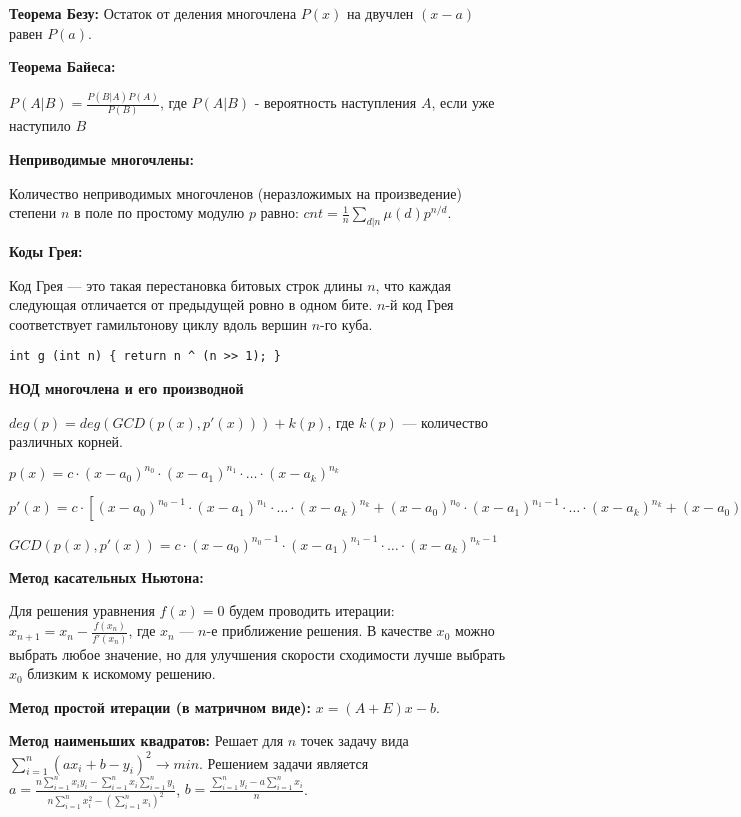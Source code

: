 \textbf{Теорема Безу:}
Остаток от деления многочлена $P(x)$ на двучлен $(x - a)$ равен $P(a)$.

\textbf{Теорема Байеса:}

$\displaystyle P(A|B)=\frac{P(B|A)P(A)}{P(B)}$, где $P(A|B)$ - вероятность наступления $A$, если уже наступило $B$

\textbf{Неприводимые многочлены:}

Количество неприводимых многочленов (неразложимых на произведение) степени $n$ в поле по простому модулю $p$ равно:
$cnt = \frac1n \sum\limits_{d|n}\mu(d)p^{n / d}$.

\textbf{Коды Грея:}

Код Грея --- это такая перестановка битовых строк длины $n$, что каждая следующая отличается от предыдущей ровно в одном бите.
$n$-й код Грея соответствует гамильтонову циклу вдоль вершин $n$-го куба.

\begin{verbatim}
int g (int n) { return n ^ (n >> 1); }
\end{verbatim}

\textbf{НОД многочлена и его производной}

$deg(p) = deg( GCD(p(x), p'(x)) ) + k(p)$, где $k(p)$ --- количество различных корней.

$p(x) = c \cdot (x - a_0)^{n_0} \cdot (x - a_1)^{n_1} \cdot \ldots \cdot (x - a_k)^{n_k}$

$p'(x) = c \cdot [ (x - a_0)^{n_0-1} \cdot (x - a_1)^{n_1} \cdot \ldots \cdot (x - a_k)^{n_k} + (x - a_0)^{n_0} \cdot (x - a_1)^{n_1-1} \cdot \ldots \cdot (x - a_k)^{n_k} + (x - a_0)^{n_0} \cdot (x - a_1)^{n_1} \cdot \ldots \cdot (x - a_k)^{n_k-1} ]$

$GCD(p(x),p'(x)) = c \cdot (x - a_0)^{n_0-1} \cdot (x - a_1)^{n_1-1} \cdot \ldots \cdot (x - a_k)^{n_k-1}$

\textbf{Метод касательных Ньютона:}

Для решения уравнения $f(x)=0$ будем проводить итерации: $x_{n+1}=x_n-\frac{f(x_n)}{f'(x_n)}$, где $x_n$ --- $n$-е приближение решения.
В качестве $x_0$ можно выбрать любое значение, но для улучшения скорости сходимости лучше выбрать $x_0$ близким к искомому решению.

\textbf{Метод простой итерации (в матричном виде):} $x=(A+E)x-b$.

\textbf{Метод наименьших квадратов:}
Решает для $n$ точек задачу вида $\sum \limits_{i=1}^{n} \left ( ax_i + b - y_i \right )^2\rightarrow min$. Решением задачи является
$a=\frac{n\sum \limits_{i=1}^{n} x_i y_i - \sum \limits_{i=1}^{n} x_i \sum \limits_{i=1}^{n} y_i}{n\sum \limits_{i=1}^{n} x_i^2 - \left ( \sum \limits_{i=1}^{n} x_i \right )^2}$,
$b=\frac{\sum \limits_{i=1}^{n} y_i - a \sum \limits_{i=1}^{n} x_i}{n}$.

